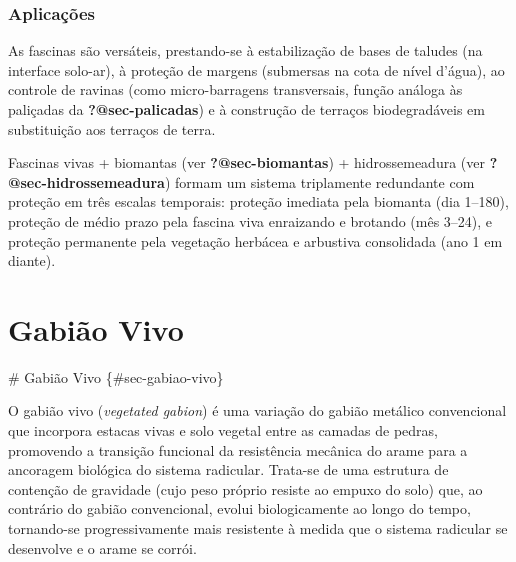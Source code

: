 \documentclass[
  portuguese,
  11pt,
  a4paper,
  open=any]{scrbook}
\begin{document}
\subsection{Aplicações}\label{aplicauxe7uxf5es}

As fascinas são versáteis, prestando-se à estabilização de bases de
taludes (na interface solo-ar), à proteção de margens (submersas na cota
de nível d'água), ao controle de ravinas (como micro-barragens
transversais, função análoga às paliçadas da \textbf{?@sec-palicadas}) e
à construção de terraços biodegradáveis em substituição aos terraços de
terra.

\begin{tcolorbox}[enhanced jigsaw, leftrule=.75mm, colframe=quarto-callout-tip-color-frame, colback=white, bottomrule=.15mm, opacityback=0, colbacktitle=quarto-callout-tip-color!10!white, breakable, bottomtitle=1mm, opacitybacktitle=0.6, title=\textcolor{quarto-callout-tip-color}{\faLightbulb}\hspace{0.5em}{Combinação com outras técnicas}, titlerule=0mm, toprule=.15mm, toptitle=1mm, rightrule=.15mm, left=2mm, arc=.35mm, coltitle=black]

Fascinas vivas + biomantas (ver \textbf{?@sec-biomantas}) +
hidrossemeadura (ver \textbf{?@sec-hidrossemeadura}) formam um sistema
triplamente redundante com proteção em três escalas temporais: proteção
imediata pela biomanta (dia 1--180), proteção de médio prazo pela
fascina viva enraizando e brotando (mês 3--24), e proteção permanente
pela vegetação herbácea e arbustiva consolidada (ano 1 em diante).

\end{tcolorbox}

\chapter{Gabião Vivo}\label{gabiuxe3o-vivo}

\# Gabião Vivo \{\#sec-gabiao-vivo\}

O gabião vivo (\emph{vegetated gabion}) é uma variação do gabião
metálico convencional que incorpora estacas vivas e solo vegetal entre
as camadas de pedras, promovendo a transição funcional da resistência
mecânica do arame para a ancoragem biológica do sistema radicular.
Trata-se de uma estrutura de contenção de gravidade (cujo peso próprio
resiste ao empuxo do solo) que, ao contrário do gabião convencional,
evolui biologicamente ao longo do tempo, tornando-se progressivamente
mais resistente à medida que o sistema radicular se desenvolve e o arame
se corrói.
\end{document}
